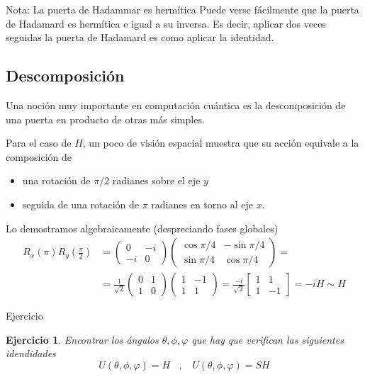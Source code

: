 \documentclass[a4paper,11pt]{book} %
\newtheorem{ejercicio_contador}{Ejercicio}
\newcommand{\Ejercicio}[1]{
		\begin{mybox_gray}{Ejercicio} 
			\begin{ejercicio_contador}
				 #1 
			\end{ejercicio_contador} 
		\end{mybox_gray}
	}
\numberwithin{equation}{chapter}
\def\lp{\left(}
\def\rp{\right)}
\begin{document}
	\begin{mybox_blue}{Nota: La puerta de Hadammar es hermítica}
	Puede verse fácilmente que la puerta de Hadamard es hermítica e igual a su inversa. Es decir, aplicar
	dos veces seguidas la puerta de Hadamard es como aplicar la identidad.
	\end{mybox_blue}


        \subsection{Descomposición}
        
Una noción muy importante en computación cuántica es la descomposición de una puerta en producto de otras más simples. 

Para el caso de $H$, un poco de visión espacial muestra que su acción equivale a la composición de
\begin{itemize}
	\item una  rotación de $\pi/2$ radianes sobre el eje $y$ 
	\item seguida de una rotación de  $\pi$ radianes en torno al eje $x$.
\end{itemize}
Lo demostramos algebraicamente (despreciando fases globales)       
	\begin{align*}
	R_x(\pi)R_{y}\left(\frac{\pi}{2}\right) & = 
	\lp \begin{matrix}0&-i\\-i&0\end{matrix}  \rp
	\lp \begin{matrix}\cos\pi/4& -\sin\pi/4 \\ \sin\pi/4 & \cos\pi/4 \end{matrix} \rp = \\
	& = \frac{1}{\sqrt{2}} \lp \begin{matrix} 0&1 \\ 1&0 \end{matrix} \rp 
	\lp \begin{matrix}1 & -1 \\ 1 & 1 \end{matrix} \rp  =
	 \frac{-i}{\sqrt{2}} \begin{bmatrix}1&1\\1&-1\end{bmatrix} =-i H \sim H
	\end{align*}

	\Ejercicio{
	Encontrar los ángulos $\theta,\phi,\varphi$ que hay que verifican las siguientes idendidades
	 \begin{equation}
	 U(\theta,\phi,\varphi) = H ~~~~,~~~~  U(\theta,\phi,\varphi) = SH
	 \end{equation}
	 }
\end{document}
